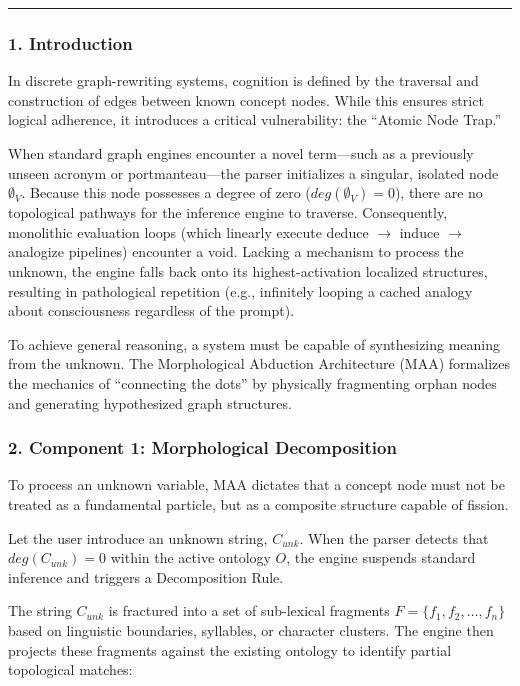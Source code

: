 \documentclass[
  11pt,
  a4paper,
]{article}
\begin{document}
\begin{center}\rule{0.5\linewidth}{0.5pt}\end{center}

\subsubsection{1. Introduction}\label{introduction}

In discrete graph-rewriting systems, cognition is defined by the
traversal and construction of edges between known concept nodes. While
this ensures strict logical adherence, it introduces a critical
vulnerability: the ``Atomic Node Trap.''

When standard graph engines encounter a novel term---such as a
previously unseen acronym or portmanteau---the parser initializes a
singular, isolated node \(\emptyset_V\). Because this node possesses a
degree of zero (\(deg(\emptyset_V) = 0\)), there are no topological
pathways for the inference engine to traverse. Consequently, monolithic
evaluation loops (which linearly execute deduce \(\rightarrow\) induce
\(\rightarrow\) analogize pipelines) encounter a void. Lacking a
mechanism to process the unknown, the engine falls back onto its
highest-activation localized structures, resulting in pathological
repetition (e.g., infinitely looping a cached analogy about
consciousness regardless of the prompt).

To achieve general reasoning, a system must be capable of synthesizing
meaning from the unknown. The Morphological Abduction Architecture (MAA)
formalizes the mechanics of ``connecting the dots'' by physically
fragmenting orphan nodes and generating hypothesized graph structures.

\subsubsection{2. Component 1: Morphological
Decomposition}\label{component-1-morphological-decomposition}

To process an unknown variable, MAA dictates that a concept node must
not be treated as a fundamental particle, but as a composite structure
capable of fission.

Let the user introduce an unknown string, \(C_{unk}\). When the parser
detects that \(deg(C_{unk}) = 0\) within the active ontology \(O\), the
engine suspends standard inference and triggers a Decomposition Rule.

The string \(C_{unk}\) is fractured into a set of sub-lexical fragments
\(F = \{f_1, f_2, \dots, f_n\}\) based on linguistic boundaries,
syllables, or character clusters. The engine then projects these
fragments against the existing ontology to identify partial topological
matches:
\end{document}
